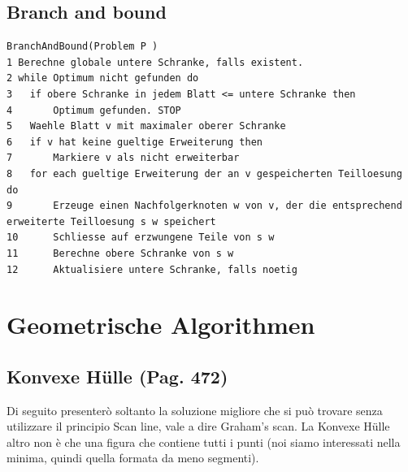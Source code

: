 \documentclass[a4paper]{book}
\newcommand{\lstIndent}{4}
\begin{document}
\section{Branch and bound}
\begin{lstlisting}[tabsize=\lstIndent]
BranchAndBound(Problem P )
1 Berechne globale untere Schranke, falls existent.
2 while Optimum nicht gefunden do
3 	if obere Schranke in jedem Blatt <= untere Schranke then
4		Optimum gefunden. STOP
5	Waehle Blatt v mit maximaler oberer Schranke
6	if v hat keine gueltige Erweiterung then
7		Markiere v als nicht erweiterbar
8	for each gueltige Erweiterung der an v gespeicherten Teilloesung do
9		Erzeuge einen Nachfolgerknoten w von v, der die entsprechend erweiterte Teilloesung s w speichert
10 		Schliesse auf erzwungene Teile von s w
11		Berechne obere Schranke von s w
12		Aktualisiere untere Schranke, falls noetig
\end{lstlisting}

\chapter{Geometrische Algorithmen}
\section{Konvexe Hülle (Pag. 472)}
Di seguito presenterò soltanto la soluzione migliore che si può trovare senza utilizzare il principio Scan line, vale a dire Graham's scan. La Konvexe Hülle altro non è che una figura che contiene tutti i punti (noi siamo interessati nella minima, quindi quella formata da meno segmenti).
\end{document}
